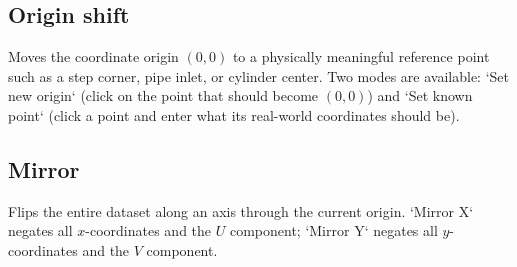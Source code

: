 \subsection{Origin shift}

Moves the coordinate origin $(0, 0)$ to a physically meaningful reference point such as a step corner, pipe inlet, or cylinder center. Two modes are available: `Set new origin` (click on the point that should become $(0, 0)$) and `Set known point` (click a point and enter what its real-world coordinates should be).

\subsection{Mirror}

Flips the entire dataset along an axis through the current origin. `Mirror X` negates all $x$-coordinates and the $U$ component; `Mirror Y` negates all $y$-coordinates and the $V$ component.

